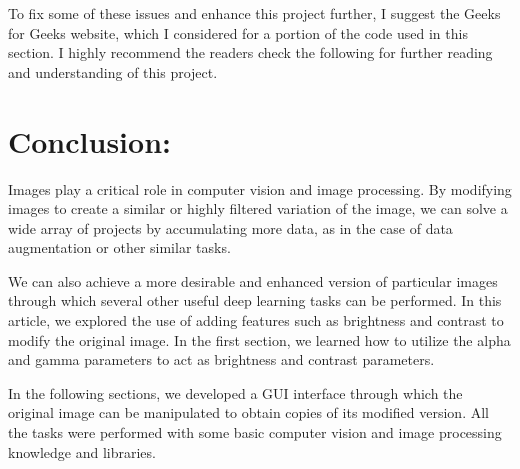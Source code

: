 To fix some of these issues and enhance this project further, I suggest the Geeks for Geeks website, which I considered for a portion of the code used in this section. I highly recommend the readers check the following  for further reading and understanding of this project.

\section{Conclusion:}




Images play a critical role in computer vision and image processing. By modifying images to create a similar or highly filtered variation of the image, we can solve a wide array of projects by accumulating more data, as in the case of data augmentation or other similar tasks.

We can also achieve a more desirable and enhanced version of particular images through which several other useful deep learning tasks can be performed. In this article, we explored the use of adding features such as brightness and contrast to modify the original image. In the first section, we learned how to utilize the alpha and gamma parameters to act as brightness and contrast parameters.

In the following sections, we developed a GUI interface through which the original image can be manipulated to obtain copies of its modified version. All the tasks were performed with some basic computer vision and image processing knowledge and libraries.

